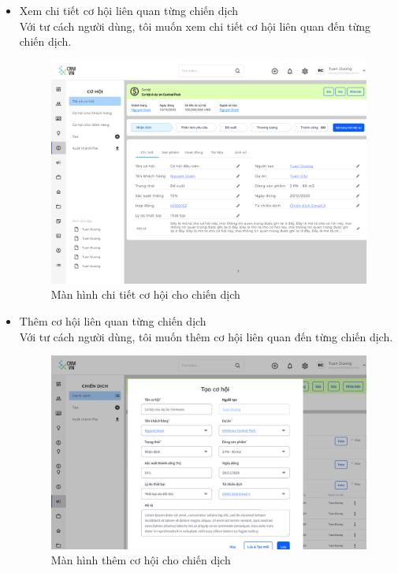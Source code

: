 \documentclass[12pt,a4paper]{article}
\begin{document}
\begin{enumerate}
\begin{itemize}
            \item Xem chi tiết cơ hội liên quan từng chiến dịch \\
            Với tư cách người dùng, tôi muốn xem chi tiết cơ hội liên quan đến từng chiến dịch.
            \begin{figure}[H]
                \centering \includegraphics[width=\textwidth]{Img/Nguyet/Cohoi/chitietcohoi.png}
                \vspace{0.5cm}
                \caption{Màn hình chi tiết cơ hội cho chiến dịch }
                \label{ctchchiendich}
            \end{figure}

            \item Thêm cơ hội liên quan từng chiến dịch \\
            Với tư cách người dùng, tôi muốn thêm cơ hội liên quan đến từng chiến dịch.

            \begin{figure}[H]
                \centering \includegraphics[width=\textwidth]{Img/Nguyet/Chiendich/taocohoicd.png}
                \vspace{0.5cm}
                \caption{Màn hình thêm cơ hội cho chiến dịch }
                \label{themchiendich}
            \end{figure}


\end{itemize}
\end{enumerate}
\end{document}
